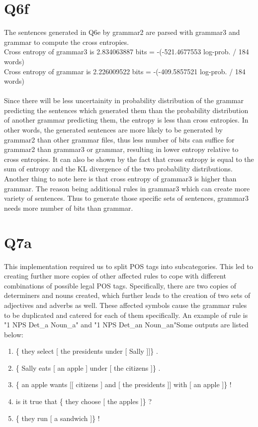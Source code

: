 \documentclass[12pt]{article}
\begin{document}
\section*{Q6f}
The sentences generated in Q6e by grammar2 are parsed with grammar3 and grammar to compute the cross entropies.\\
Cross entropy of grammar3 is 2.834063887 bits = -(-521.4677553 log-prob. / 184 words)\\
Cross entropy of grammar is 2.226009522 bits = -(-409.5857521 log-prob. / 184 words)\\
\\
Since there will be less uncertainity in probability distribution of the grammar predicting the sentences which generated them than the probability distribution of another grammar predicting them, the entropy is less than cross entropies. In other words, the generated sentences are more likely to be generated by grammar2 than other grammar files, thus less number of bits can suffice for grammar2 than grammar3 or grammar, resulting in lower entropy relative to cross entropies. It can also be shown by the fact that cross entropy is equal to the sum of entropy and the KL divergence of the two probability distributions.\\
Another thing to note here is that cross entropy of grammar3 is higher than grammar. The reason being additional rules in grammar3 which can create more variety of sentences. Thus to generate those specific sets of sentences, grammar3 needs more number of bits than grammar.
\pagebreak
\section*{Q7a}
This implementation required us to split POS tags into subcategories. This led to creating further more copies of other affected rules to cope with different combinations of possible legal POS tags. Specifically, there are two copies of determiners and nouns created, which further leads to the creation of two sets of adjectives and adverbs as well. These affected symbols cause the grammar rules to be duplicated and catered for each of them specifically. An example of rule is "1\hspace{1cm}	NPS\hspace{1cm}	Det\_a Noun\_a" and "1\hspace{1cm}	NPS\hspace{1cm}	Det\_an Noun\_an"Some outputs are listed below:\\
\begin{enumerate}
	\item \{ they  select [ the  presidents  under [ Sally ]]\} .  
	\item \{ Sally  eats [ an  apple ] under [ the  citizens ]\} . 
	\item \{ an  apple  wants [[ citizens ] and [ the  presidents ]] with [ an  apple ]\} ! 
	\item is  it  true  that \{ they  choose [ the  apples ]\} ? 
	\item \{ they  run [ a  sandwich ]\} ! 
\end{enumerate}
\pagebreak
\end{document}
